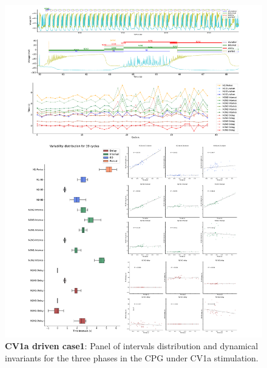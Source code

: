 \begin{figure}[htbp]
	\centering
	\includegraphics[width=1.1\textwidth]{./invariants/data/SUSSEX/CV1a_driven1/images/3phases/panel_with_intervals.pdf}
	\caption{\textbf{CV1a driven case1}: Panel of intervals distribution and dynamical invariants for the three phases in the CPG under CV1a stimulation.}
	\label{fig:cv1a 1 3phases}
\end{figure}

